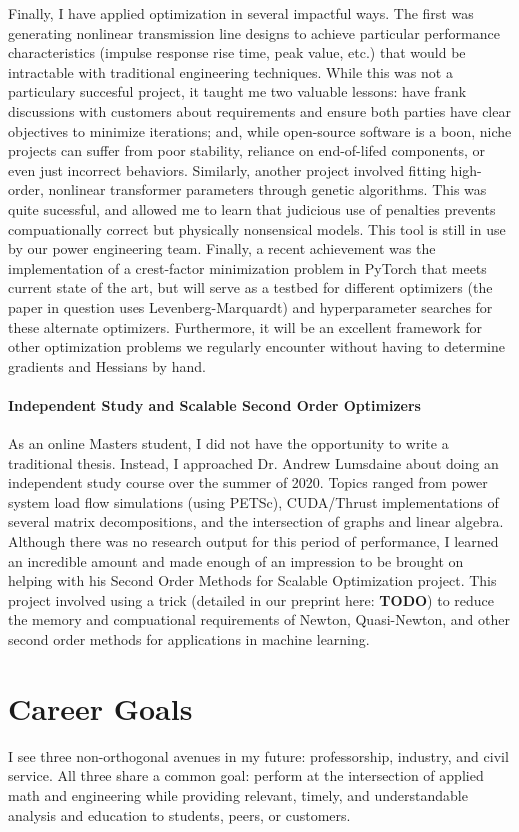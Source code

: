 \documentclass[letterpaper]{article}
\begin{document}
Finally, I have applied optimization in several impactful ways. The first was generating
nonlinear transmission line designs to achieve particular performance characteristics
(impulse response rise time, peak value, etc.) that would be intractable with traditional
engineering techniques. While this was not a particulary succesful project, it taught me two
valuable lessons: have frank discussions with customers about requirements and ensure
both parties have clear objectives to minimize iterations; and, while open-source
software is a boon, niche projects can suffer from poor stability, reliance on end-of-lifed
components, or even just incorrect behaviors. Similarly, another project involved
fitting high-order, nonlinear transformer parameters through genetic algorithms. This
was quite sucessful, and allowed me to learn that judicious use of penalties prevents
compuationally correct but physically nonsensical models. This tool is still in use
by our power engineering team. Finally, a recent achievement was the implementation of a
crest-factor minimization problem in PyTorch that meets current state of the art, but
will serve as a testbed for different optimizers (the paper in question uses
Levenberg-Marquardt) and hyperparameter searches for these alternate optimizers.
Furthermore, it will be an excellent framework for other optimization problems
we regularly encounter without having to determine gradients and Hessians by hand.

\paragraph{Independent Study and Scalable Second Order Optimizers}
As an online Masters student, I did not have the opportunity to write a traditional
thesis. Instead, I approached Dr. Andrew Lumsdaine about doing an independent
study course over the summer of 2020. Topics ranged from power system load flow
simulations (using PETSc), CUDA/Thrust implementations of several matrix
decompositions, and the intersection of graphs and linear algebra. Although there was
no research output for this period of performance, I learned an incredible amount
and made enough of an impression to be brought on helping with his Second Order Methods
for Scalable Optimization project. This project involved using a trick (detailed
in our preprint here: \textbf{TODO}) to reduce the memory and compuational requirements
of Newton, Quasi-Newton, and other second order methods for applications in machine
learning. 

\section*{Career Goals}
I see three non-orthogonal avenues in my future: professorship, industry, and civil service.
All three share a common goal: perform at the intersection of applied math and engineering
while providing relevant, timely, and understandable analysis and education to students,
peers, or customers.
\end{document}
